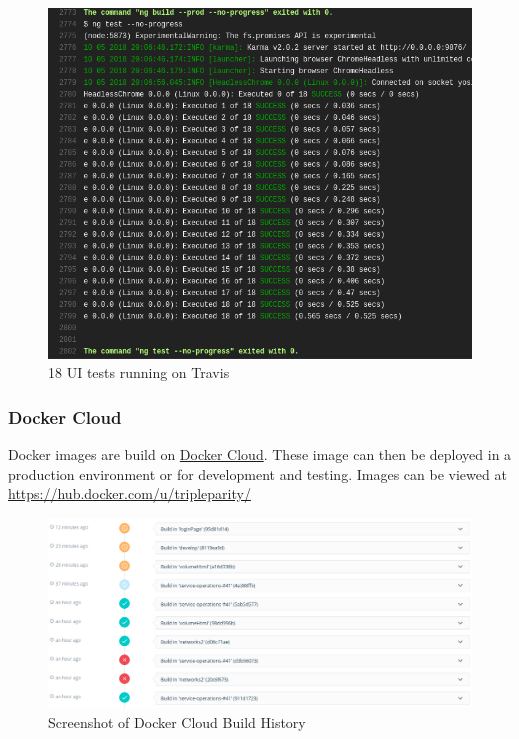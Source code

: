 \documentclass[]{article}
\begin{document}
\begin{figure}[H]
	\centering
	\includegraphics[scale=0.5]{travis_ui_tests_output_1.png}
	\caption{18 UI tests running on Travis}
\end{figure}

\subsubsection{Docker Cloud}
Docker images are build on \href{https://cloud.docker.com/}{Docker Cloud}.
These image can then be deployed in a production environment or for development and testing.
Images can be viewed at \url{https://hub.docker.com/u/tripleparity/}

\begin{figure}[H]
	\centering
	\includegraphics[scale=0.4]{docker_cloud_build_history.png}
	\caption{Screenshot of Docker Cloud Build History}
\end{figure}
\end{document}
